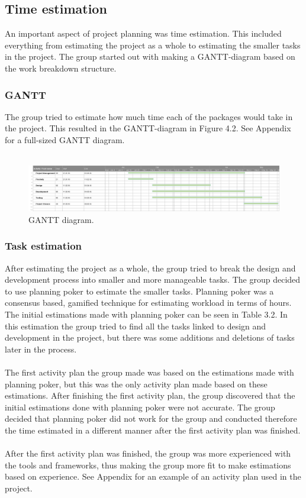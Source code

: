 \subsection{Time estimation}
An important aspect of project planning was time estimation. This included everything from estimating the project as a whole to estimating the smaller tasks in the project. The group started out with making a GANTT-diagram based on the work breakdown structure. 
\subsubsection{GANTT}
The group tried to estimate how much time each of the packages would take in the project. This resulted in the GANTT-diagram in Figure 4.2. See Appendix  for a full-sized GANTT diagram.\\
\\
\begin{figure}[H]
    \centering
    \includegraphics[width=\textwidth]{images/gantt1.png}
    \caption{GANTT diagram.}
\end{figure}

\subsubsection{Task estimation}
After estimating the project as a whole, the group tried to break the design and development process into smaller and more manageable tasks. The group decided to use planning poker to estimate the smaller tasks. Planning poker was a consensus based, gamified technique for estimating workload in terms of hours. The initial estimations made with planning poker can be seen in Table 3.2. In this estimation the group tried to find all the tasks linked to design and development in the project, but there was some additions and deletions of tasks later in the process.\\
\\
The first activity plan the group made was based on the estimations made with planning poker, but this was the only activity plan made based on these estimations. After finishing the first activity plan, the group discovered that the initial estimations done with  planning poker were not accurate. The group decided that planning poker did not work for the group and conducted therefore the time estimated in a different manner after the first activity plan was finished. \\
\\
After the first activity plan was finished, the group was more experienced with the tools and frameworks, thus making the group more fit to make estimations based on experience. See Appendix  for an example of an activity plan used in the project.


